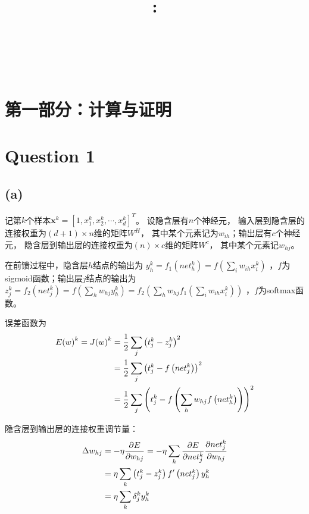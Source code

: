 \documentclass{article}
\title{
    \vspace{2in}
    \textmd{\textbf{\courseName}:\homeworkTitle}\\
    \vspace{0.1in}
    \large{\studentId}\\
    \large{\studentName}\\
    \vspace{3in}
}
\newcommand{\question}[1]{\section*{Question #1}}
\renewcommand{\part}[1]{\subsection*{(#1)}}
\begin{document}
\maketitle
\date{}
\pagebreak

\section*{第一部分：计算与证明}

\question{1}
\part{a}
记第$k$个样本${\pmb{x}^k} = {\left[ {1,x_1^k,x_2^k, \cdots ,x_d^k} \right]^T}$。
设隐含层有$n$个神经元，
输入层到隐含层的连接权重为$\left( {d + 1} \right) \times n$维的矩阵${W^H}$，
其中某个元素记为${w_{ih}}$；输出层有$c$个神经元，
隐含层到输出层的连接权重为$\left( n \right) \times c$维的矩阵${W^c}$，
其中某个元素记${w_{hj}}$。

在前馈过程中，隐含层$h$结点的输出为
$y_h^k = {f_1}\left( {net_h^k} \right) = f\left( {\sum\limits_i {{w_{ih}}x_i^k} } \right)$
，$f$为sigmoid函数；输出层$j$结点的输出为
$z_j^k = {f_2}\left( {net_j^k} \right) = f\left( {\sum\limits_h {{w_{hj}}y_h^k} } \right) = {f_2}\left( {\sum\limits_h {{w_{hj}}{f_1}\left( {\sum\limits_i {{w_{ih}}x_i^k} } \right)} } \right)$
，$f$为softmax函数。

误差函数为
\begin{align*}
	E{\left( w \right)^k} = J{\left( w \right)^k} 
	&= {1 \over 2}\sum\limits_j {{{\left( {t_j^k - z_j^k} \right)}^2}} \\
	&= {1 \over 2}\sum\limits_j {{{\left( {t_j^k - f\left( {net_j^k} \right)} \right)}^2}} \\
	&= {1 \over 2}\sum\limits_j {{{\left( {t_j^k - f\left( {\sum\limits_h {{w_{hj}}f\left( {net_h^k} \right)} } \right)} \right)}^2}} 
\end{align*}

隐含层到输出层的连接权重调节量：
\begin{align*}
	\Delta {w_{hj}} 
	&=  - \eta {{\partial E} \over {\partial {w_{hj}}}} 
	= - \eta \sum\limits_k {{{\partial E} \over {\partial net_j^k}}{{\partial net_j^k} \over {\partial {w_{hj}}}}}\\
	&= \eta \sum\limits_k {\left( {t_j^k - z_j^k} \right)f'\left( {net_j^k} \right)y_h^k} \\
	&= \eta \sum\limits_k {\delta _j^ky_h^k} 
\end{align*}
\end{document}

